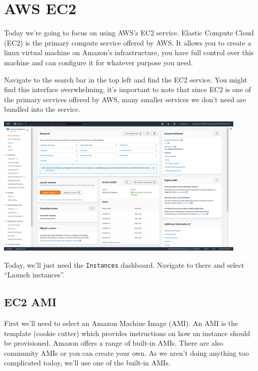\documentclass{csse4400}
\begin{document}
\begin{enumerate}
\end{enumerate}


\section{AWS EC2}

Today we're going to focus on using AWS's EC2 service.
Elastic Compute Cloud (EC2) is the primary compute service offered by AWS.
It allows you to create a linux virtual machine on Amazon's infrastructure,
you have full control over this machine and can configure it for whatever purpose you need.

Navigate to the search bar in the top left and find the EC2 service.
You might find this interface overwhelming,
it's important to note that since EC2 is one of the primary services offered by AWS,
many smaller services we don't need are bundled into the service.

\includegraphics[width=0.9\textwidth]{images/ec2-interface}

Today, we'll just need the \texttt{Instances} dashboard.
Navigate to there and select ``Launch instances''.

\subsection{EC2 AMI}
First we'll need to select an Amazon Machine Image (AMI).
An AMI is the template (cookie cutter) which provides instructions on how an instance should be provisioned.
Amazon offers a range of built-in AMIs. There are also community AMIs or you can create your own.
As we aren't doing anything too complicated today, we'll use one of the built-in AMIs.
\end{document}
